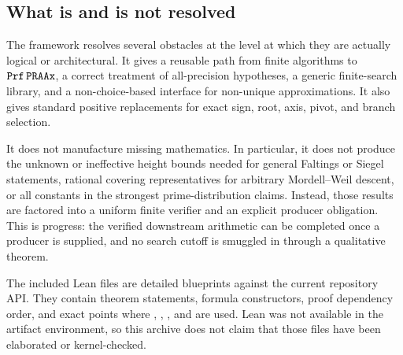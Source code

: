 \subsection{What is and is not resolved}

The framework resolves several obstacles at the level at which they are
actually logical or architectural.  It gives a reusable path from finite
algorithms to \(\texttt{Prf}\,\texttt{PRAAx}\), a correct treatment of all-precision hypotheses,
a generic finite-search library, and a non-choice-based interface for
non-unique approximations.  It also gives standard positive replacements for
exact sign, root, axis, pivot, and branch selection.

It does not manufacture missing mathematics.  In particular, it does not
produce the unknown or ineffective height bounds needed for general Faltings
or Siegel statements, rational covering representatives for arbitrary
Mordell--Weil descent, or all constants in the strongest prime-distribution
claims.  Instead, those results are factored into a uniform finite verifier and
an explicit producer obligation.  This is progress: the verified downstream
arithmetic can be completed once a producer is supplied, and no search cutoff
is smuggled in through a qualitative theorem.

The included Lean files are detailed blueprints against the current repository
API.  They contain theorem statements, formula constructors, proof dependency
order, and exact points where , ,
, and  are used.  Lean was not available
in the artifact environment, so this archive does not claim that those files
have been elaborated or kernel-checked.
